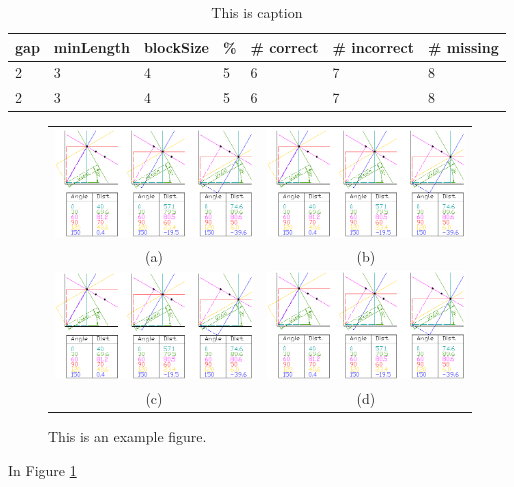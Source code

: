 \documentclass[11pt]{article}
\begin{document}
\tableofcontents
\scriptsize{
\begin{table}[htb!]
\begin{center}
\begin{tabular}{| l | l | l | l | l | l | l |} \hline
gap & minLength	& blockSize & \% & \# correct & \# incorrect & \# missing \\ \hline
2 & 3 & 4 & 5 & 6 & 7 & 8 \\
2 & 3 & 4 & 5 & 6 & 7 & 8 \\ \hline
\end{tabular}
\end{center}
\caption{This is caption}
\label{tbl-fig}
\end{table} 
}

\begin{figure}[htb!]
\begin{center}
\begin{tabular}{c c}
\includegraphics[width=3.0in]{SHT-example2.png} &
\includegraphics[width=3.0in]{SHT-example2.png} \\
(a) & (b) \\ 
\includegraphics[width=3.0in]{SHT-example2.png} &
\includegraphics[width=3.0in]{SHT-example2.png} \\
(c) & (d) 
\end{tabular}
\end{center}
\caption{This is an example figure.}
\label{fig1}
\end{figure}

In Figure \ref{fig1}
\end{document}
